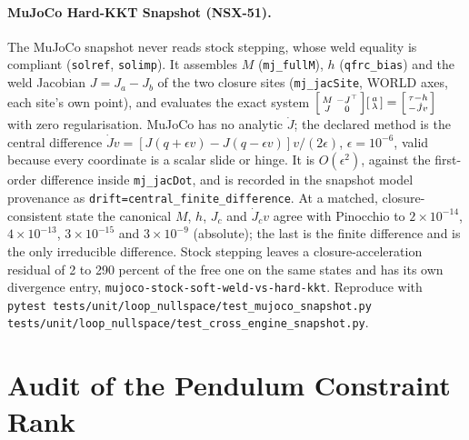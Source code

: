 \documentclass[11pt,a4paper]{article}
\begin{document}
\paragraph{MuJoCo Hard-KKT Snapshot (NSX-51).}
The MuJoCo snapshot never reads stock stepping, whose weld equality is
compliant (\texttt{solref}, \texttt{solimp}).  It assembles $M$
(\texttt{mj\_fullM}), $h$ (\texttt{qfrc\_bias}) and the weld Jacobian
$J=J_{a}-J_{b}$ of the two closure sites (\texttt{mj\_jacSite}, WORLD axes,
each site's own point), and evaluates the exact system
$\begin{bsmallmatrix}M&-J^{\top}\\J&0\end{bsmallmatrix}
\begin{bsmallmatrix}a\\\lambda\end{bsmallmatrix}=
\begin{bsmallmatrix}\tau-h\\-\dot{J}v\end{bsmallmatrix}$
with zero regularisation.  MuJoCo has no analytic $\dot{J}$; the declared
method is the central difference
$\dot{J}v=\left[J(q+\epsilon v)-J(q-\epsilon v)\right]v/(2\epsilon)$,
$\epsilon=10^{-6}$, valid because every coordinate is a scalar slide or hinge.
It is $O(\epsilon^{2})$, against the first-order difference inside
\texttt{mj\_jacDot}, and is recorded in the snapshot model provenance as
\texttt{drift=central\_finite\_difference}.  At a matched, closure-consistent
state the canonical $M$, $h$, $J_c$ and $\dot{J}_cv$ agree with Pinocchio to
$2\times10^{-14}$, $4\times10^{-13}$, $3\times10^{-15}$ and
$3\times10^{-9}$ (absolute); the last is the finite difference and is the only
irreducible difference.  Stock stepping leaves a closure-acceleration residual
of 2 to 290 percent of the free one on the same states and has its own
divergence entry, \texttt{mujoco-stock-soft-weld-vs-hard-kkt}.  Reproduce with
\texttt{pytest tests/unit/loop\_nullspace/test\_mujoco\_snapshot.py
tests/unit/loop\_nullspace/test\_cross\_engine\_snapshot.py}.

\section{Audit of the Pendulum Constraint Rank}
\label{sec:audit}
\end{document}
